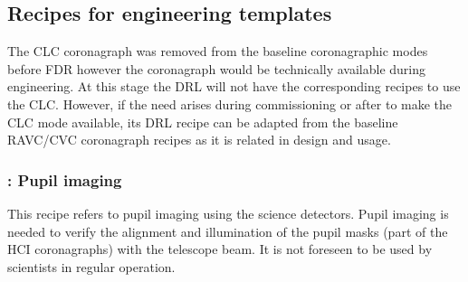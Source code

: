 
\subsection{Recipes for engineering templates}
\label{ssec:recipes_technical}


The CLC coronagraph was removed from the baseline coronagraphic modes before FDR however the coronagraph would be technically available during engineering. At this stage the DRL will not have the corresponding recipes to use the CLC. However, if the need arises during commissioning or after to make the CLC mode available, its DRL recipe can be adapted from the baseline RAVC/CVC coronagraph recipes as it is related in design and usage.

\subsubsection{: Pupil imaging}\label{rec:metis_pupil_imaging}
\label{sssec:pupil_imaging}

This recipe refers to pupil imaging using the science detectors.
Pupil imaging is needed to verify the alignment and illumination of the pupil masks (part of the HCI coronagraphs) with the telescope beam.
It is not foreseen to be used by scientists in regular operation.



